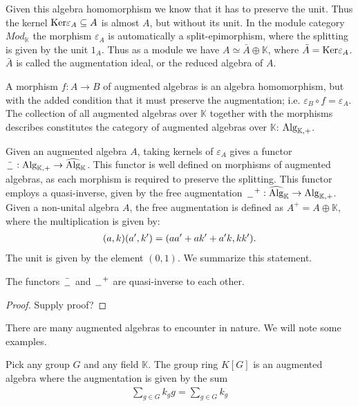 \documentclass[../thesis.tex]{subfiles}
\begin{document}
            Given this algebra homomorphism we know that it has to preserve the unit. Thus the kernel $\tt{Ker}\varepsilon_A \subseteq A$ is almost $A$, but without its unit. In the module category $Mod_\mathbb{K}$ the morphism $\varepsilon_A$ is automatically a split-epimorphism, where the splitting is given by the unit $1_A$. Thus as a module we have $A \simeq \bar{A}\oplus\mathbb{K}$, where $\bar{A} = \tt{Ker}\varepsilon_A$. $\bar{A}$ is called the augmentation ideal, or the reduced algebra of $A$.

            A morphism $f : A \rightarrow B$ of augmented algebras is an algebra homomorphism, but with the added condition that it must preserve the augmentation; i.e. $\varepsilon_B \circ f = \varepsilon_A$. The collection of all augmented algebras over $\mathbb{K}$ together with the morphisms describes constitutes the category of augmented algebras over $\mathbb{K}$: $\tt{Alg}_{\mathbb{K},+}$.

            Given an augmented algebra $A$, taking kernels of $\varepsilon_A$ gives a functor $\bar{\argument} : \tt{Alg}_{\mathbb{K},+} \rightarrow \widehat{\tt{Alg}}_\mathbb{K}$. This functor is well defined on morphisms of augmented algebras, as each morphism is required to preserve the splitting. This functor employs a quasi-inverse, given by the free augmentation $\argument^+ : \widehat{\tt{Alg}}_\mathbb{K} \rightarrow \tt{Alg}_{\mathbb{K},+}$. Given a non-unital algebra $A$, the free augmentation is defined as $A^+ = A\oplus\mathbb{K}$, where the multiplication is given by:
            \begin{align*}
                (a,k)(a',k') = (aa' + ak' + a'k, kk')\tt{.}
            \end{align*}
            The unit is given by the element $(0,1)$. We summarize this statement.
            
            \begin{proposition}
                The functors $\bar{\argument}$ and $\argument^+$ are quasi-inverse to each other.
            \end{proposition}

            \begin{proof}
                Supply proof? 
            \end{proof}

            There are many augmented algebras to encounter in nature. We will note some examples.

            \begin{example}
                Pick any group $G$ and any field $\mathbb{K}$. The group ring $K[G]$ is an augmented algebra where the augmentation is given by the sum
                \begin{align*}
                    \sum_{g\in G}k_gg = \sum_{g\in G}k_g
                \end{align*} 
            \end{example}
\end{document}

